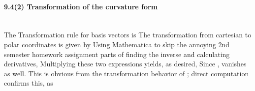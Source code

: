 \paragraph{9.4(2) Transformation of the curvature form}\ \\
The Transformation rule for basis vectors is
The transformation from cartesian to polar coordinates is given by
Using Mathematica to skip the annoying 2nd semester homework assignment parts of finding the inverse and calculating derivatives,
Multiplying these two expressions yields, as desired,
Since ,  vanishes as well. This is obvious from the transformation behavior of \ieq{\theta}; direct computation confirms this, as
